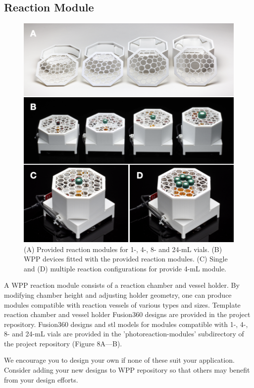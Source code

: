 \documentclass[11pt]{article}
\begin{document}
\clearpage

\subsection{Reaction Module} \label{SEC:enclosure}

\begin{figure}[H]
	\includegraphics[width=\textwidth]{"./fig8.png"}
	\caption{(A) Provided reaction modules for 1-, 4-, 8- and 24-mL vials. (B) WPP devices fitted with the provided reaction modules. (C) Single and (D) multiple reaction configurations for provide 4-mL module.}
\end{figure}

A WPP reaction module consists of a reaction chamber and vessel holder.
By modifying chamber height and adjusting holder geometry, one can produce modules compatible with reaction vessels of various types and sizes.
Template reaction chamber and vessel holder Fusion360 designs are provided in the project repository.
Fusion360 designs and stl models for modules compatible with 1-, 4-, 8- and 24-mL vials are provided in the 'photoreaction-modules' subdirectory of the project repository (Figure 8A—B).

We encourage you to design your own if none of these suit your application.
Consider adding your new designs to WPP repository so that others may benefit from your design efforts.
\end{document}
